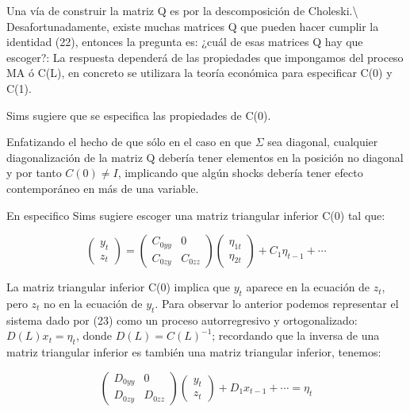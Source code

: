 \documentclass[
]{book}
\begin{document}
Una vía de construir la matriz Q es por la descomposición de Choleski.\textbackslash{}
Desafortunadamente, existe muchas matrices Q que pueden hacer cumplir la identidad (22), entonces la pregunta es: ¿cuál de esas matrices Q hay que escoger?: La respuesta dependerá de las propiedades que impongamos del proceso MA ó C(L), en concreto se utilizara la teoría económica para especificar C(0) y C(1).

Sims sugiere que se especifica las propiedades de C(0).

Enfatizando el hecho de que sólo en el caso en que \(\Sigma\) sea diagonal, cualquier diagonalización de la matriz Q debería tener elementos en la posición no diagonal y por tanto \(C(0)\neq I\), implicando que algún shocks debería tener efecto contemporáneo en más de una variable.

En especifico Sims sugiere escoger una matriz triangular inferior C(0) tal que:

\begin{equation}
    \left( \begin{array}{c}
    y_{t} \\
    z_{t} 
    \end{array}\right)=\left( \begin{array}{cc}
    C_{0yy} & 0\\
    C_{0zy} & C_{0zz}
    \end{array}
    \right) \left( \begin{array}{c}
    \eta_{1t}\\
    \eta_{2t}
    \end{array}
    \right) +C_{1}\eta_{t-1}+\cdots
\end{equation}

La matriz triangular inferior C(0) implica que \(y_{t}\) aparece en la ecuación de \(z_{t}\), pero \(z_{t}\) no en la ecuación de \(y_{t}\). Para observar lo anterior podemos representar el sistema dado por (23) como un proceso autorregresivo y ortogonalizado: \(D(L)x_{t}=\eta_{t}\), donde \(D(L)=C(L)^{-1}\); recordando que la inversa de una matriz triangular inferior es también una matriz triangular inferior, tenemos:

\begin{equation}
      \left( \begin{array}{cc}
      D_{0yy} & 0\\
      D_{0zy} & D_{0zz}
      \end{array}
      \right)
      \left( \begin{array}{c}
      y_{t} \\
      z_{t} 
      \end{array}\right)+D_{1}x_{t-1}+\cdots=\eta_{t}\nonumber
\end{equation}
\end{document}
